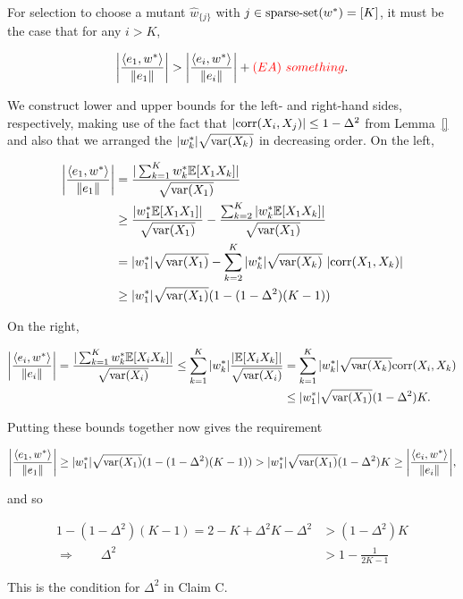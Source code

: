 For selection to choose a mutant $\hat{w}_{\{j\}}$ with
$j \in \mathrm{sparse\mbox{-}set}(w^*) = [K]$, it must be the case that for any $i > K$,

\[
\bigg\vert \frac{\langle e_1, w^* \rangle}{\Vert e_1 \Vert} \bigg\vert
> \bigg\vert \frac{\langle e_i, w^* \rangle}{\Vert e_i \Vert} \bigg\vert + {\color{red} (EA) ~something}.
\]

We construct lower and upper bounds for the left- and right-hand sides,
respectively, making use of the fact that
$|\mathrm{corr}(X_i, X_j)| \leq 1 - \Delta^2$ from Lemma~\ref{} and also
that we arranged the $\vert w^*_k \vert \sqrt{\mathrm{var}(X_k)}$ in decreasing order.
On the left,

\begin{align*}
\bigg\vert \frac{\langle e_1, w^* \rangle}{\Vert e_1 \Vert} \bigg\vert
&= \frac{\vert\sum_{k=1}^K w^*_k \mathbb{E}[X_1 X_k]\vert}{\sqrt{\mathrm{var}(X_1)}} \\
&\ge \frac{\vert w^*_1 \mathbb{E}[X_1 X_1]\vert}{\sqrt{\mathrm{var}(X_1)}} - \frac{\sum_{k=2}^K \vert w^*_k \mathbb{E}[X_1 X_k] \vert}{\sqrt{\mathrm{var}(X_1)}} \\
&= \vert w^*_1 \vert \sqrt{\mathrm{var}(X_1)} - \sum_{k=2}^K \vert w^*_k \vert \sqrt{\mathrm{var}(X_k)}~\vert \mathrm{corr}(X_1, X_k) \vert \\
&\ge \vert w^*_1 \vert \sqrt{\mathrm{var}(X_1)}(1 - (1 - \Delta^2) (K-1))
\end{align*}

\noindent On the right,

\begin{align*}
\bigg\vert \frac{\langle e_i, w^* \rangle}{\Vert e_i \Vert} \bigg\vert
= \frac{\vert\sum_{k=1}^K w^*_k \mathbb{E}[X_i X_k]\vert}{\sqrt{\mathrm{var}(X_i)}}
\le \sum_{k=1}^K \vert w^*_k \vert \frac{\vert \mathbb{E}[X_i X_k]\vert}{\sqrt{\mathrm{var}(X_i)}}
&= \sum_{k=1}^K \vert w^*_k \vert \sqrt{\mathrm{var}(X_k)} \mathrm{corr}(X_i, X_k) \\
&\le \vert w^*_1 \vert \sqrt{\mathrm{var}(X_1)} (1 - \Delta^2) K.
\end{align*}

\noindent Putting these bounds together now gives the requirement

\[
\bigg\vert \frac{\langle e_1, w^* \rangle}{\Vert e_1 \Vert} \bigg\vert
\ge \vert w^*_1 \vert \sqrt{\mathrm{var}(X_1)}(1 - (1 - \Delta^2) (K-1))
> \vert w^*_1 \vert \sqrt{\mathrm{var}(X_1)} (1 - \Delta^2) K
\ge \bigg\vert \frac{\langle e_i, w^* \rangle}{\Vert e_i \Vert} \bigg\vert,
\]

\noindent and so

\begin{align*}
1 - (1 - \Delta^2) (K-1) = 2 - K + \Delta^2 K - \Delta^2 &> (1 - \Delta^2) K \\
\Rightarrow \qquad \Delta^2 &> 1 - \frac{1}{2 K - 1}
\end{align*}

\noindent  This is the condition for $\Delta^2$ in Claim C.
